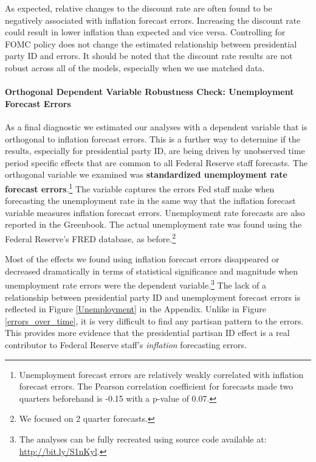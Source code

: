 \documentclass[a4paper]{article}\usepackage{graphicx, color}
\begin{document}
As expected, relative changes to the discount rate are often found to be negatively associated with inflation forecast errors. Increasing the discount rate could result in lower inflation than expected and vice versa. Controlling for FOMC policy does not change the estimated relationship between presidential party ID and errors. It should be noted that the discount rate results are not robust across all of the models, especially when we use matched data. 




\paragraph{Orthogonal Dependent Variable Robustness Check: Unemployment Forecast Errors}

As a final diagnostic we estimated our analyses with a dependent variable that is orthogonal to inflation forecast errors. This is a further way to determine if the results, especially for presidential party ID, are being driven by unobserved time period specific effects that are common to all Federal Reserve staff forecasts. The orthogonal variable we examined was {\bf{standardized unemployment rate forecast errors}}.\footnote{Unemployment forecast errors are relatively weakly correlated with inflation forecast errors. The Pearson correlation coefficient for forecasts made two quarters beforehand is -0.15 with a p-value of 0.07.} The variable captures the errors Fed staff make when forecasting the unemployment rate in the same way that the inflation forecast variable measures inflation forecast errors. Unemployment rate forecasts are also reported in the Greenbook. The actual unemployment rate was found using the Federal Reserve's FRED database, as before.\footnote{We focused on 2 quarter forecasts.}

Most of the effects we found using inflation forecast errors disappeared or decreased dramatically in terms of statistical significance and magnitude when unemployment rate errors were the dependent variable.\footnote{The analyses can be fully recreated using source code available at: \url{http://bit.ly/S1nKyl}.} The lack of a relationship between presidential party ID and unemployment forecast errors is reflected in Figure \ref{Unemployment} in the Appendix. Unlike in Figure \ref{errors_over_time}, it is very difficult to find any partisan pattern to the errors. This provides more evidence that the presidential partisan ID effect is a real contributor to Federal Reserve staff's \emph{inflation} forecasting errors.
\end{document}
